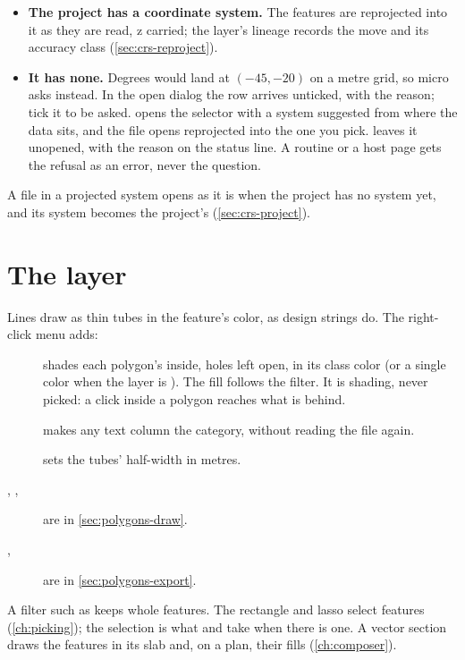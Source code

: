 \begin{itemize}
\item \textbf{The project has a coordinate system.} The features are reprojected into it as they
  are read, z carried; the layer's lineage records the move and its accuracy class
  (\cref{sec:crs-reproject}).
\item \textbf{It has none.} Degrees would land at $(-45, -20)$ on a metre grid, so micro asks
  instead. In the open dialog the row arrives unticked, with the reason; tick it to be asked.
   opens the selector with a system suggested from where the
  data sits, and the file opens reprojected into the one you pick.  leaves it unopened,
  with the reason on the status line. A routine or a host page gets the refusal as an error, never
  the question.
\end{itemize}

A file in a projected system opens as it is when the project has no system yet, and its system
becomes the project's (\cref{sec:crs-project}).

\section{The layer}\label{sec:polygons-layer}

Lines draw as thin tubes in the feature's color, as design strings do. The right-click menu adds:

\begin{description}
\item[] shades each polygon's inside, holes left open, in its class
  color (or a single color when the layer is ). The fill follows the filter. It is shading,
  never picked: a click inside a polygon reaches what is behind.
\item[] makes any text column the category, without reading the file
  again.
\item[] sets the tubes' half-width in metres.
\item[, , ]
  are in \cref{sec:polygons-draw}.
\item[, ] are in
  \cref{sec:polygons-export}.
\end{description}

A filter such as  keeps whole features. The rectangle and
lasso select features (\cref{ch:picking}); the selection is what  and
 take when there is one. A vector section draws the features in its slab and,
on a plan, their fills (\cref{ch:composer}).

